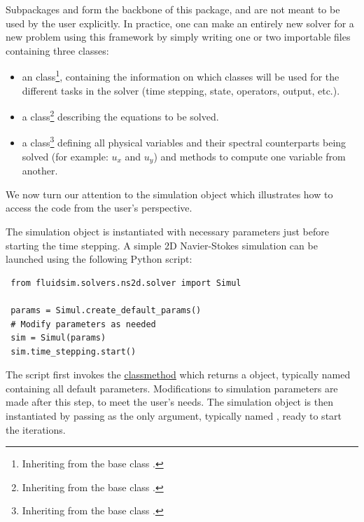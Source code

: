 Subpackages  and  form the backbone of this
package, and are not meant to be used by the user explicitly.
%
In practice, one can make an entirely new solver for a new problem using this
framework by simply writing one or two importable files containing three classes:
\begin{itemize}
\item an  class\footnote{Inheriting from the base class
.}, containing the
information on which classes will be used for the different tasks in the solver
(time stepping, state, operators, output, etc.).
\item a  class\footnote{Inheriting from the base class
.} describing the equations to be
solved.
\item a  class\footnote{Inheriting from the base class
.} defining all physical variables and
their spectral counterparts being solved (for example: $u_x$ and $u_y$) and
methods to compute one variable from another.
\end{itemize}

We now turn our attention to the simulation object which illustrates how to
access the code from the user's perspective.


The simulation object is instantiated with necessary parameters just before
starting the time stepping.  A simple 2D Navier-Stokes simulation can be
launched using the following Python script:

\begin{verbatim}
 from fluidsim.solvers.ns2d.solver import Simul

 params = Simul.create_default_params()
 # Modify parameters as needed
 sim = Simul(params)
 sim.time_stepping.start()
\end{verbatim}

The script first invokes the 
\href{https://docs.python.org/3/library/functions.html#classmethod}{classmethod}
which returns a  object, typically named
 containing all default parameters.
%
Modifications to simulation parameters are made after this step, to meet the
user's needs. The simulation object is then instantiated by passing
 as the only argument, typically named ,
ready to start the iterations.

